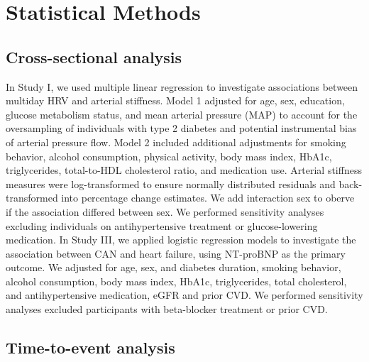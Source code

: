 \documentclass[
  a4paper,
  headsepline=true,
  open=any]{scrbook}
\begin{document}
\hypertarget{statistical-methods}{%
\section{Statistical Methods}\label{statistical-methods}}

\hypertarget{cross-sectional-analysis}{%
\subsection{Cross-sectional analysis}\label{cross-sectional-analysis}}

In Study I, we used multiple linear regression to investigate
associations between multiday HRV and arterial stiffness. Model 1
adjusted for age, sex, education, glucose metabolism status, and mean
arterial pressure (MAP) to account for the oversampling of individuals
with type 2 diabetes and potential instrumental bias of arterial
pressure flow. Model 2 included additional adjustments for smoking
behavior, alcohol consumption, physical activity, body mass index,
HbA1c, triglycerides, total-to-HDL cholesterol ratio, and medication
use. Arterial stiffness measures were log-transformed to ensure normally
distributed residuals and back-transformed into percentage change
estimates. We add interaction sex to oberve if the association differed
between sex. We performed sensitivity analyses excluding individuals on
antihypertensive treatment or glucose-lowering medication. In Study III,
we applied logistic regression models to investigate the association
between CAN and heart failure, using NT-proBNP as the primary outcome.
We adjusted for age, sex, and diabetes duration, smoking behavior,
alcohol consumption, body mass index, HbA1c, triglycerides, total
cholesterol, and antihypertensive medication, eGFR and prior CVD. We
performed sensitivity analyses excluded participants with beta-blocker
treatment or prior CVD.

\hypertarget{time-to-event-analysis}{%
\subsection{Time-to-event analysis}\label{time-to-event-analysis}}
\end{document}
